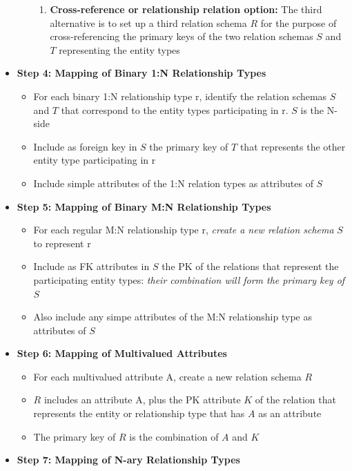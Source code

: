 \begin{itemize}[label=\(\rhd\)]
\begin{itemize}[label=\(\rhd\)]
\begin{enumerate}
            \item \textbf{Cross-reference or relationship relation option:} The third alternative is to set up a third relation schema $R$ for the purpose of cross-referencing the primary keys of the two relation schemas $S$ and $T$ representing the entity types
        \end{enumerate}
    \end{itemize}
    \item \textbf{Step 4: Mapping of Binary 1:N Relationship Types}
    \begin{itemize}[label=\(\rhd\)]
        \item For each binary 1:N relationship type r, identify the relation schemas $S$ and $T$ that correspond to the entity types participating in r. $S$ is the N-side
        \item Include as foreign key in $S$ the primary key of $T$ that represents the other entity type participating in r
        \item Include simple attributes of the 1:N relation types as attributes of $S$
    \end{itemize}
    \item \textbf{Step 5: Mapping of Binary M:N Relationship Types}
    \begin{itemize}[label=\(\rhd\)]
        \item For each regular M:N relationship type r, \textit{create a new relation schema} $S$ to represent r
        \item Include as FK attributes in $S$ the PK of the relations that represent the participating entity types: \textit{their combination will form the primary key of} $S$
        \item Also include any simpe attributes of the M:N relationship type as attributes of $S$
    \end{itemize}
    \item \textbf{Step 6: Mapping of Multivalued Attributes}
    \begin{itemize}[label=\(\rhd\)]
        \item For each multivalued attribute A, create a new relation schema $R$
        \item $R$ includes an attribute A, plus the PK attribute $K$ of the relation that represents the entity or relationship type that has $A$ as an attribute
        \item The primary key of $R$ is the combination of $A$ and $K$
    \end{itemize}
    \item \textbf{Step 7: Mapping of N-ary Relationship Types}

\end{itemize}
